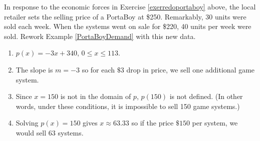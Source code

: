 \documentclass{ximera}
\begin{document}
\begin{problem}
In response to the economic forces in Exercise \ref{exerredoportaboy} above, the local retailer sets the selling price of a PortaBoy at \$250.  Remarkably, 30 units were sold each week.  When the systems went on sale for \$220, 40 units per week were sold.  Rework Example \ref{PortaBoyDemand}  with this new data.

\begin{solution}
\begin{enumerate}
\item 
$p(x) = -3x+340$, $0 \leq x \leq 113$.


\item The slope is $m = -3$ so for each $\$3$ drop in price, we sell one additional game system.

\item   Since $x = 150$ is not in the domain of $p$, $p(150)$ is not defined.  (In other words, under these conditions, it is impossible to sell 150 game systems.)

\item Solving $p(x) = 150$ gives $x \approx 63.33$ so if the price  $\$150$ per system, we would sell $63$ systems.
\end{enumerate}
\end{solution}
\end{problem}
\end{document}
